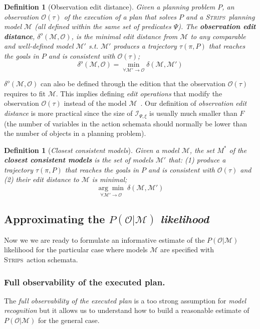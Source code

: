 \documentclass[letterpaper]{article} %
\newcommand{\strips}{\textsc{Strips}}     %
\newtheorem{definition}[theorem]{Definition}
\begin{document}
\begin{definition}[Observation edit distance]
Given a planning problem $P$, an observation $\mathcal{O}(\tau)$ of the execution of a plan that solves $P$ and a \strips\ planning model $\mathcal{M}$ (all defined within the same set of predicates $\Psi$). The {\bf observation edit distance}, $\delta^o(\mathcal{M},\mathcal{O})$, is the minimal edit distance from $\mathcal{M}$ to any {\em comparable} and well-defined model $\mathcal{M}'$ s.t. $\mathcal{M}'$ produces a trajectory $\tau(\pi,P)$ that reaches the goals in $P$ and is {\em consistent} with $\mathcal{O}(\tau)$; \[\delta^o(\mathcal{M},\mathcal{O})=\min_{\forall \mathcal{M}' \rightarrow \mathcal{O}} \delta(\mathcal{M},\mathcal{M}')\]
\end{definition}

$\delta^o(\mathcal{M},\mathcal{O})$ can also be defined through the edition that the observation $\mathcal{O}(\tau)$ requires to fit $\mathcal{M}$. This implies defining {\em edit operations} that modify the observation $\mathcal{O}(\tau)$ instead of the model $\mathcal{M}$~\cite{yang2007learning,SohrabiRU16}. Our definition of {\em observation edit distance} is more practical since the size of ${\mathcal I}_{\Psi,\xi}$ is usually much smaller than $F$ (the number of variables in the action schemata should normally be lower than the number of objects in a planning problem).

\begin{definition}[{\em Closest consistent models}] \label{consistent}
Given a model $\mathcal{M}$, the set $M^*$ of the {\bf closest consistent models} is the set of models $\mathcal{M}'$ that: (1) produce a trajectory $\tau(\pi,P)$ that reaches the goals in $P$ and is {\em consistent} with $\mathcal{O}(\tau)$ and (2) their {\em edit distance} to $\mathcal{M}$ is minimal;
  \[\underset{\forall \mathcal{M}' \rightarrow \mathcal{O}}{\arg\min}\ \delta(\mathcal{M},\mathcal{M}') \]
\end{definition}

\subsection{Approximating the $P(\mathcal{O}|\mathcal{M})$ {\em likelihood}}

Now we we are ready to formulate an informative estimate of the $P(\mathcal{O}|\mathcal{M})$ likelihood for the particular case where models $\mathcal{M}$ are specified with \strips\ action schemata.

\subsubsection{Full observability of the executed plan.} The {\em full observability of the executed plan} is a too strong assumption for {\em model recognition} but it allows us to understand how to build a reasonable estimate of $P(\mathcal{O}|\mathcal{M})$ for the general case.
\end{document}
